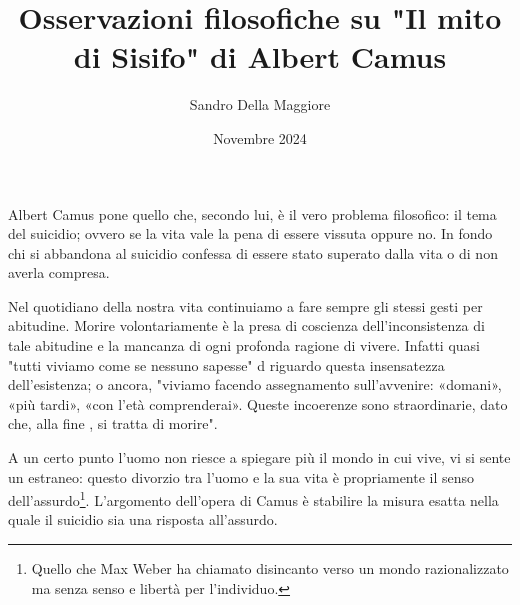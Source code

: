 \documentclass[a4paper,12pt,oneside]{article}%
\begin{document}
	\author{Sandro Della Maggiore}
	\title{Osservazioni filosofiche su "Il mito di Sisifo" di Albert Camus}
	\date{Novembre 2024}
	
	\maketitle
	
Albert Camus pone quello che, secondo lui, è il vero problema filosofico: il tema del suicidio; ovvero se la vita vale la pena di essere vissuta	oppure no. In fondo chi si abbandona al suicidio confessa di essere stato superato dalla vita o di non averla compresa.

Nel quotidiano della nostra vita continuiamo a fare sempre gli stessi gesti per abitudine. Morire volontariamente è la presa di coscienza dell'inconsistenza di tale abitudine e la mancanza di ogni profonda ragione di vivere. Infatti quasi "tutti viviamo come se nessuno sapesse" d riguardo questa insensatezza dell'esistenza; o ancora, "viviamo facendo assegnamento sull'avvenire: «domani», «più tardi», «con l'età comprenderai». Queste incoerenze sono straordinarie, dato che, alla fine , si tratta di morire".

A un certo punto l'uomo non riesce a spiegare più il mondo in cui vive, vi si sente un estraneo: questo divorzio tra l'uomo e la sua vita è propriamente il senso dell'assurdo\footnote{Quello che Max Weber ha chiamato disincanto verso un mondo razionalizzato ma senza  senso e libertà per l'individuo.}. L'argomento dell'opera di Camus è stabilire la misura esatta nella quale il suicidio sia una risposta all'assurdo.


	
	
	
\end{document}
